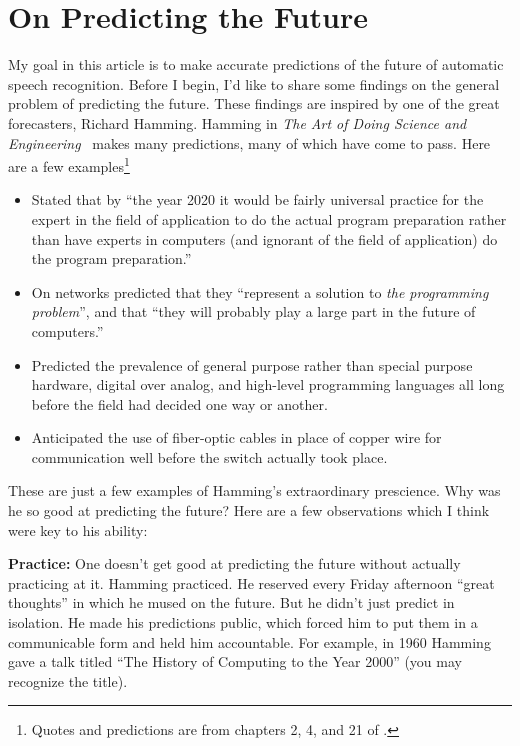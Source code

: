 \section{On Predicting the Future}
\label{sec:predicting_future}

My goal in this article is to make accurate predictions of the future of
automatic speech recognition. Before I begin, I'd like to share some findings
on the general problem of predicting the future. These findings are inspired by
one of the great forecasters, Richard Hamming. Hamming in \emph{The Art of
Doing Science and Engineering}~\citep{hamming1997art} makes many predictions,
many of which have come to pass. Here are a few examples\footnote{Quotes and
predictions are from chapters 2, 4, and 21 of \citet{hamming1997art}.}
\begin{itemize}
    \item Stated that by ``the year 2020 it would be fairly universal
        practice for the expert in the field of application to do the actual
        program preparation rather than have experts in computers (and ignorant
        of the field of application) do the program preparation.''
    \item On networks predicted that they ``represent a solution to
        \emph{the programming problem}'', and that ``they will probably play a
        large part in the future of computers.''
    \item Predicted the prevalence of general purpose rather than special
        purpose hardware, digital over analog, and high-level programming
        languages all long before the field had decided one way or
        another.
    \item Anticipated the use of fiber-optic cables in place of copper wire for
        communication well before the switch actually took place.
\end{itemize}

These are just a few examples of Hamming's extraordinary prescience. Why was he
so good at predicting the future? Here are a few observations which I think
were key to his ability:

{\bf Practice:} One doesn't get good at predicting the future without actually
practicing at it. Hamming practiced. He reserved every Friday afternoon ``great
thoughts'' in which he mused on the future. But he didn't just predict in
isolation. He made his predictions public, which forced him to put them in a
communicable form and held him accountable. For example, in 1960 Hamming gave a
talk titled ``The History of Computing to the Year 2000'' (you may recognize
the title).

